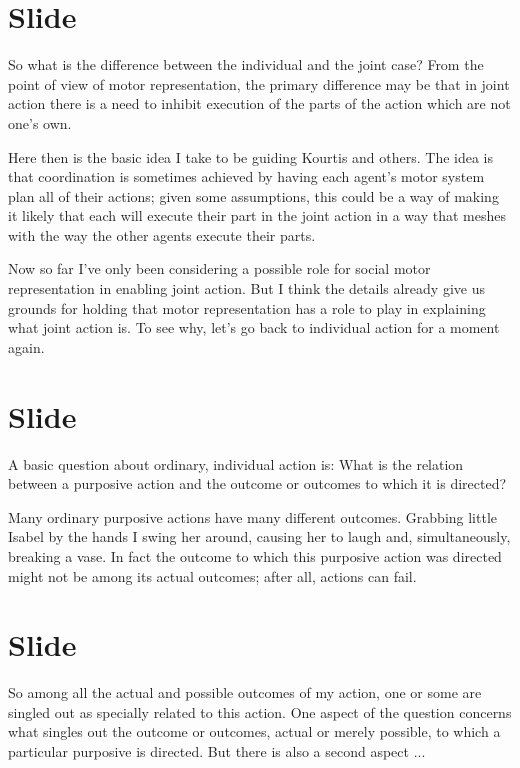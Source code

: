 \documentclass[12pt,\papersize]{extarticle}
\begin{document}
\section{Slide}
So what is the difference between the individual and the joint case?  From the point of view of motor representation, the primary difference may be that in joint action there is a need to inhibit execution of the parts of the action which are not one’s own.

Here then is the basic idea I take to be guiding Kourtis and others.
The idea is that coordination is sometimes achieved by having each agent’s motor system plan all of their actions; 
given some assumptions, this could be a way of making it likely that each will execute their part in the joint action in a way that meshes with the way the other agents execute their parts.

Now so far I’ve only been considering a possible role for social motor representation in enabling joint action.  
But I think the details already give us grounds for holding that motor representation has a role to play in explaining what joint action is.
To see why,
let’s go back to individual action for a moment again.



\section{Slide}
A basic question about ordinary, individual action is:
What is the relation between a purposive action and the outcome or outcomes to which it is directed?

Many ordinary purposive actions have many different outcomes.
Grabbing little Isabel by the hands I swing her around, causing her to laugh and, simultaneously, breaking a vase.
In fact the outcome to which this purposive action was directed might not be among its actual outcomes; after all, actions can fail.



\section{Slide}
So among all the actual and possible outcomes of my action, one or some are singled out as specially related to this action.
One aspect of the question concerns what singles out the outcome or outcomes, actual or merely possible, to which a particular purposive is directed.
But there is also a second aspect ...
\end{document}
